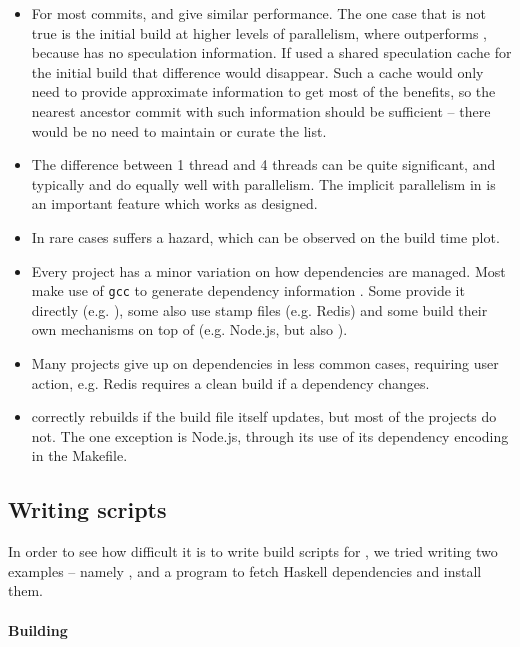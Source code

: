 \begin{itemize}
\item For most commits, \Rattle and \Make give similar performance. The one case that is not true is the initial build at higher levels of parallelism, where \Make outperforms \Rattle, because \Rattle has no speculation information. If \Rattle used a shared speculation cache for the initial build that difference would disappear. Such a cache would only need to provide approximate information to get most of the benefits, so the nearest ancestor commit with such information should be sufficient -- there would be no need to maintain or curate the list.
\item The difference between 1 thread and 4 threads can be quite significant, and typically \Make and \Rattle do equally well with parallelism. The implicit parallelism in \Rattle is an important feature which works as designed.
\item In rare cases \Rattle suffers a hazard, which can be observed on the build time plot.
\item Every \Make project has a minor variation on how dependencies are managed. Most make use of \texttt{gcc} to generate dependency information%
  . Some provide it directly (e.g. \Fsatrace), some also use stamp files (e.g. Redis) and some build their own mechanisms on top of \Make (e.g. Node.js, but also \citet[\S2]{hadrian}).
\item Many projects give up on dependencies in less common cases, requiring user action, e.g. Redis requires a clean build if a dependency changes.
\item \Rattle correctly rebuilds if the build file itself updates, but most of the \Make projects do not. The one exception is Node.js, through its use of its dependency encoding in the Makefile.
\end{itemize}


\subsection{Writing \Rattle scripts}
\label{sec:eval:writing_rattle}

In order to see how difficult it is to write build scripts for \Rattle, we tried writing two examples -- namely \Fsatrace, and a program to fetch Haskell dependencies and install them.

\paragraph{Building \Fsatrace}

